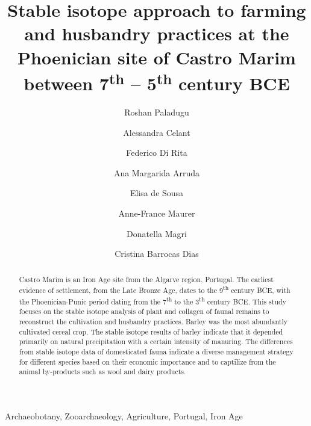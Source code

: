 \documentclass[3p]{elsarticle} %
\begin{document}
\begin{frontmatter}

  \title{Stable isotope approach to farming and husbandry practices at the Phoenician site of Castro Marim between 7\textsuperscript{th} -- 5\textsuperscript{th} century BCE}
    \author[Universidade de Évora,Laboratório HERCULES,Sapienza Università di Roma]{Roshan Paladugu}
    \author[Sapienza Università di Roma]{Alessandra Celant}
    \author[Sapienza Università di Roma]{Federico Di Rita}
    \author[Universidade de Lisboa]{Ana Margarida Arruda}
    \author[Universidade de Lisboa]{Elisa de Sousa}
    \author[Universidade de Évora,Laboratório HERCULES]{Anne-France Maurer}
    \author[Sapienza Università di Roma]{Donatella Magri}
    \author[Universidade de Évora,Laboratório HERCULES]{Cristina Barrocas Dias}
      \address[Universidade de Évora]{Departamento de Química, Escola de Ciências e Tecnologia, Universidade de Évora, Colégio Luís António Verney, Rua Romão Ramalho 59, Évora, Portugal (7000-671)}
    \address[Laboratório HERCULES]{Laboratório HERCULES, Universidade de Évora, Palácio do Vimioso, Largo Marquês de Marialva 8, 7000-554 Évora, Portugal}
    \address[Sapienza Università di Roma]{Dipartimento di Biologia Ambientale, Sapienza Università di Roma, Piazzale A. Moro 5, 00185 Roma, Italy}
    \address[Universidade de Lisboa]{Centro de Arqueologia da Universidade de Lisboa, Faculdade de Letras da Universidade de Lisboa, Alameda da Universidade, 1600-214, Lisboa, Portugal}
  
  \begin{abstract}
  Castro Marim is an Iron Age site from the Algarve region, Portugal. The earliest evidence of settlement, from the Late Bronze Age, dates to the 9\textsuperscript{th} century BCE, with the Phoenician-Punic period dating from the 7\textsuperscript{th} to the 3\textsuperscript{th} century BCE. This study focuses on the stable isotope analysis of plant and collagen of faunal remains to reconstruct the cultivation and husbandry practices. Barley was the most abundantly cultivated cereal crop. The stable isotope results of barley indicate that it depended primarily on natural precipitation with a certain intensity of manuring. The differences from stable isotope data of domesticated fauna indicate a diverse management strategy for different species based on their economic importance and to captilize from the animal by-products such as wool and dairy products.
  \end{abstract}
   \begin{keyword} Archaeobotany, Zooarchaeology, Agriculture, Portugal, Iron Age\end{keyword}
 \end{frontmatter}
\end{document}
